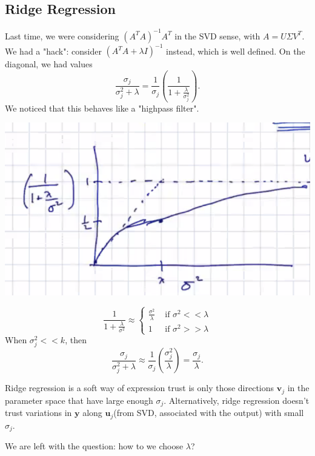 \documentclass[11pt]{scrartcl}
\newcommand{\Vu}{\mathbf{u}}
\newcommand{\Vv}{\mathbf{v}}
\newcommand{\Vy}{\mathbf{y}}
\begin{document}
\subsection{Ridge Regression}
Last time, we were considering $(A^TA)^{-1}A^T$ in the SVD sense, with $A = U \Sigma V^T$.  We had a "hack":  consider $(A^TA + \lambda I)^{-1}$ instead, which is well defined.  On the diagonal, we had values 
$$\frac{\sigma_j}{\sigma_j^2 + \lambda} = \frac{1}{\sigma_j}\left (\frac{1}{1 + \frac{\lambda}{\sigma_j^2}}\right).$$
We noticed that this behaves like a "highpass filter".
\begin{center}
\includegraphics[scale=0.5]{graph.png}
\end{center}
$$\frac{1}{1 + \frac{\lambda}{\sigma^2}} \approx \begin{cases}
\frac{\sigma^2}{\lambda} & \text{ if } \sigma^2 << \lambda \\ 
1 & \text{ if } \sigma^2 >> \lambda 
\end{cases}$$
When $\sigma_j^2 << k$, then $$\frac{\sigma_j}{\sigma_j^2 + \lambda} \approx \frac{1}{\sigma_j}\left (\frac{\sigma_j^2}{\lambda}\right ) = \frac{\sigma_j}{\lambda}.$$

Ridge regression is a soft way of expression trust is only those directions $\Vv_j$ in the parameter space that have large enough $\sigma_j$.  Alternatively, ridge regression doesn't trust variations in $\Vy$ along $\Vu_j$(from SVD, associated with the output) with small $\sigma_j$.

We are left with the question: how to we choose $\lambda$?
\end{document}
